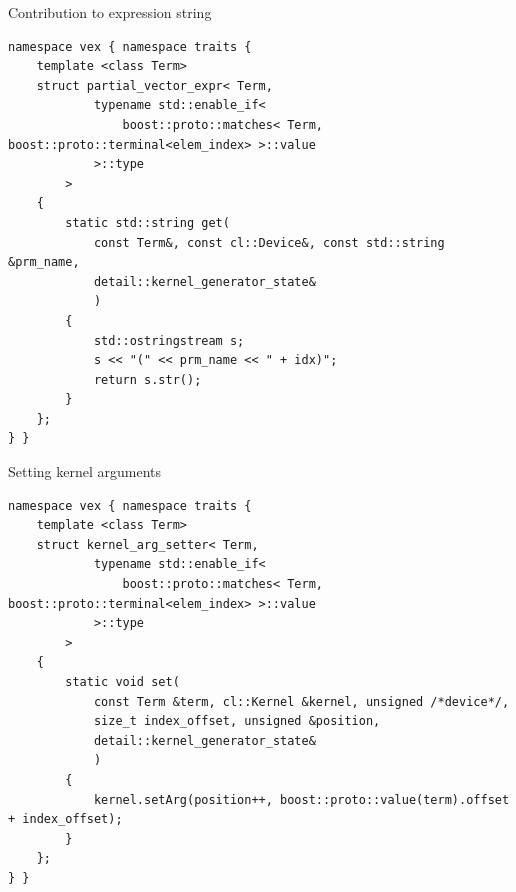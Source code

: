 \documentclass[@BEAMER_OPTIONS@]{beamer}
\begin{document}
\begin{frame}[fragile]{Contribution to expression string}
    \begin{exampleblock}{}
        \begin{lstlisting}
namespace vex { namespace traits {
    template <class Term>
    struct partial_vector_expr< Term,
            typename std::enable_if<
                boost::proto::matches< Term, boost::proto::terminal<elem_index> >::value
            >::type
        >
    {
        static std::string get(
            const Term&, const cl::Device&, const std::string &prm_name,
            detail::kernel_generator_state&
            )
        {
            std::ostringstream s;
            s << "(" << prm_name << " + idx)";
            return s.str();
        }
    };
} }
        \end{lstlisting}
    \end{exampleblock}
\end{frame}

\begin{frame}[fragile]{Setting kernel arguments}
    \begin{exampleblock}{}
        \begin{lstlisting}
namespace vex { namespace traits {
    template <class Term>
    struct kernel_arg_setter< Term,
            typename std::enable_if<
                boost::proto::matches< Term, boost::proto::terminal<elem_index> >::value
            >::type
        >
    {
        static void set(
            const Term &term, cl::Kernel &kernel, unsigned /*device*/,
            size_t index_offset, unsigned &position,
            detail::kernel_generator_state&
            )
        {
            kernel.setArg(position++, boost::proto::value(term).offset + index_offset);
        }
    };
} }
        \end{lstlisting}
    \end{exampleblock}
\end{frame}

\begin{frame}
    \begin{center}
        \begin{Huge}
            \color{chameleon1}{Questions?}
        \end{Huge}
    \end{center}
\end{frame}
\end{document}
